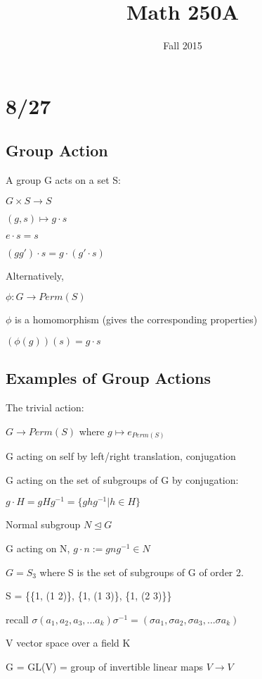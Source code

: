 \documentclass[12pt]{article}
\title{Math 250A}
\date{\normalsize Fall 2015}
\begin{document}
\maketitle

\section{8/27}

\subsection{Group Action}
\noindent
A group G acts on a set S:

$G \times S \to S$

$(g, s) \mapsto g \cdot s$

$e \cdot s = s$

$(g g') \cdot s = g \cdot (g' \cdot s)$

\noindent
Alternatively,

$\phi: G \to Perm(S)$

$\phi$ is a homomorphism (gives the corresponding properties)

$(\phi(g))(s) = g \cdot s$

\subsection{Examples of Group Actions}

\noindent
The trivial action:

$G \to Perm(S)$ where $g \mapsto e_{Perm(S)}$

\noindent
G acting on self by left/right translation, conjugation

\noindent
G acting on the set of subgroups of G by conjugation:

$g \cdot H = gHg^{-1} = \{ghg^{-1} | h \in H\}$

\noindent
Normal subgroup $N \trianglelefteq G$

G acting on N, $g \cdot n := gng^{-1} \in N$

\noindent
$G = S_3$ where S is the set of subgroups of G of order 2.

S = \{\{1, (1 2)\}, \{1, (1 3)\}, \{1, (2 3)\}\}

\noindent recall
$\sigma (a_1, a_2, a_3, ... a_k) \sigma^{-1} = (\sigma a_1, \sigma a_2, \sigma a_3, ... \sigma a_k)$

\noindent
V vector space over a field K

G = GL(V) = group of invertible linear maps $V \to V$
\end{document}
